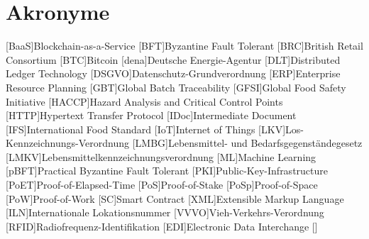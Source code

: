 \section*{Akronyme}            %
\begin{acronym}[HACCP]
	[BaaS]{Blockchain-as-a-Service}
  [BFT]{Byzantine Fault Tolerant}
  [BRC]{British Retail Consortium}
	[BTC]{Bitcoin}
	[dena]{Deutsche Energie-Agentur}
	[DLT]{Distributed Ledger Technology}
  [DSGVO]{Datenschutz-Grundverordnung}
  [ERP]{Enterprise Resource Planning}
  [GBT]{Global Batch Traceability}
  [GFSI]{Global Food Safety Initiative}
  [HACCP]{Hazard Analysis and Critical Control Points}
  [HTTP]{Hypertext Transfer Protocol}
  [IDoc]{Intermediate Document}
  [IFS]{International Food Standard}
	[IoT]{Internet of Things}
  [LKV]{Los-Kennzeichnungs-Verordnung}
  [LMBG]{Lebensmittel- und Bedarfsgegenständegesetz}
  [LMKV]{Lebensmittelkennzeichnungsverordnung}
	[ML]{Machine Learning}
  [pBFT]{Practical Byzantine Fault Tolerant}
  [PKI]{Public-Key-Infrastructure}
  [PoET]{Proof-of-Elapsed-Time}
  [PoS]{Proof-of-Stake}
  [PoSp]{Proof-of-Space}
	[PoW]{Proof-of-Work}
	[SC]{Smart Contract}
  [XML]{Extensible Markup Language}
  [ILN]{Internationale Lokationsnummer}
  [VVVO]{Vieh-Verkehrs-Verordnung}
  [RFID]{Radiofrequenz-Identifikation}
  [EDI]{Electronic Data Interchange}
  \acro{}[]{}
\end{acronym}

\newpage

\listoffigures
{}
\listoftables
{}
\newpage
